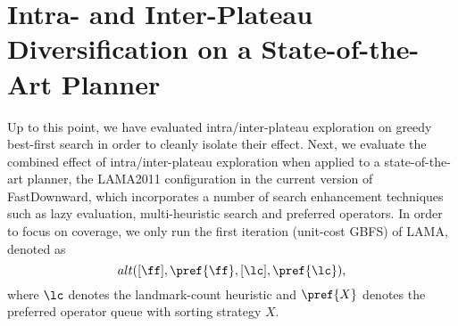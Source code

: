 \section{Intra- and Inter-Plateau Diversification on a State-of-the-Art Planner} %

Up to this point, we have evaluated intra/inter-plateau exploration on greedy best-first search in order to cleanly isolate their effect.
Next, we evaluate the combined effect of intra/inter-plateau exploration when applied to a state-of-the-art planner,
% 
the LAMA2011 configuration in the current version of FastDownward,
which incorporates a number of search enhancement techniques such as lazy evaluation, multi-heuristic search and preferred operators.
In order to focus on coverage, we only run the first iteration (unit-cost GBFS) of LAMA, 
denoted as \[ alt([\ff],\pref{\ff},[\lc],\pref{\lc}), \] where
$\lc$ denotes the landmark-count heuristic
and $\pref{X}$ denotes the preferred operator queue with sorting strategy $X$.




% 

